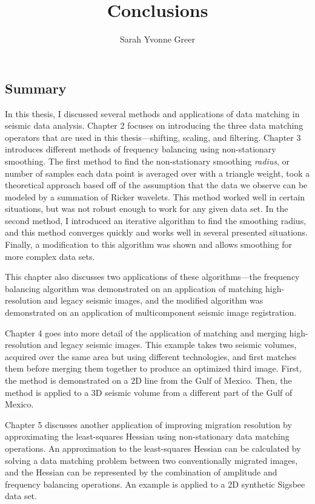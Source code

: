 \title{Conclusions}
\author{Sarah Yvonne Greer}
\maketitle

\subsection{Summary}

In this thesis, I discussed several methods and applications of data matching in seismic data analysis.
Chapter 2 focuses on introducing the three data matching operators that are used in this thesis---shifting, scaling, and filtering.
Chapter 3 introduces different methods of frequency balancing using non-stationary smoothing. 
The first method to find the non-stationary smoothing {\em radius}, or number of samples each data point is averaged over with a triangle weight, took a theoretical approach based off of the assumption that the data we observe can be modeled by a summation of Ricker wavelets.
This method worked well in certain situations, but was not robust enough to work for any given data set.
In the second method, I introduced an iterative algorithm to find the smoothing radius, and this method converges quickly and works well in several presented situations. 
Finally, a modification to this algorithm was shown and allows smoothing for more complex data sets.

This chapter also discusses two applications of these algorithms---the frequency balancing algorithm was demonstrated on an application of matching high-resolution and legacy seismic images, and the modified algorithm was demonstrated on an application of multicomponent seismic image registration.

Chapter 4 goes into more detail of the application of matching and merging high-resolution and legacy seismic images.
This example takes two seismic volumes, acquired over the same area but using different technologies, and first matches them before merging them together to produce an optimized third image.
First, the method is demonstrated on a 2D line from the Gulf of Mexico.
Then, the method is applied to a 3D seismic volume from a different part of the Gulf of Mexico.

Chapter 5 discusses another application of improving migration resolution by approximating the least-squares Hessian using non-stationary data matching operations.
An approximation to the least-squares Hessian can be calculated by solving a data matching problem between two conventionally migrated images, and the Hessian can be represented by the combination of amplitude and frequency balancing operations.
An example is applied to a 2D synthetic Sigsbee data set.

